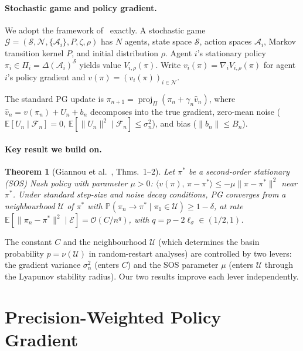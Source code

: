 \documentclass[10pt,letterpaper]{article}
\newtheorem{theorem}{Theorem}
\newcommand{\E}{\mathbb{E}}
\newcommand{\Prob}{\mathbb{P}}
\newcommand{\calS}{\mathcal{S}}
\newcommand{\calN}{\mathcal{N}}
\newcommand{\calA}{\mathcal{A}}
\newcommand{\calU}{\mathcal{U}}
\newcommand{\ip}[2]{\langle #1,\, #2 \rangle}
\newcommand{\norm}[1]{\| #1 \|}
\newcommand{\proj}{\operatorname{proj}}
\begin{document}
\paragraph{Stochastic game and policy gradient.}
We adopt the framework of~\cite{giannou2022} exactly.
A stochastic game $\mathcal{G} = (\calS, \calN, \{\calA_i\}, P, \zeta, \rho)$
has $N$ agents, state space $\calS$, action spaces $\calA_i$, Markov
transition kernel $P$, and initial distribution $\rho$. Agent $i$'s
stationary policy $\pi_i \in \Pi_i = \Delta(\calA_i)^{\calS}$ yields
value $V_{i,\rho}(\pi)$. Write $v_i(\pi) = \nabla_i V_{i,\rho}(\pi)$
for agent $i$'s policy gradient and $v(\pi) = (v_i(\pi))_{i \in \calN}$.

The standard PG update is $\pi_{n+1} = \proj_\Pi(\pi_n + \gamma_n \hat{v}_n)$,
where $\hat{v}_n = v(\pi_n) + U_n + b_n$ decomposes into the true
gradient, zero-mean noise ($\E[U_n \mid \mathcal{F}_n] = 0$,
$\E[\norm{U_n}^2 \mid \mathcal{F}_n] \leq \sigma_n^2$),
and bias ($\norm{b_n} \leq B_n$).

\paragraph{Key result we build on.}

\begin{theorem}[Giannou et al.~\cite{giannou2022}, Thms.~1--2]
\label{thm:giannou}
Let $\pi^*$ be a \emph{second-order stationary (SOS)} Nash policy with
parameter $\mu > 0$: $\ip{v(\pi)}{\pi - \pi^*} \leq -\mu\norm{\pi - \pi^*}^2$
near $\pi^*$. Under standard step-size and noise decay conditions,
PG converges from a neighbourhood $\calU$ of $\pi^*$ with
$\Prob(\pi_n \to \pi^* \mid \pi_1 \in \calU) \geq 1-\delta$, at rate
$\E[\norm{\pi_n - \pi^*}^2 \mid \mathcal{E}] = \mathcal{O}(C/n^q)$,
with $q = p - 2\ell_\sigma \in (1/2, 1)$.
\end{theorem}

The constant $C$ and the neighbourhood $\calU$ (which determines the
basin probability $p = \nu(\calU)$ in random-restart analyses) are
controlled by two levers: the gradient variance $\sigma_n^2$ (enters
$C$) and the SOS parameter $\mu$ (enters $\calU$ through the Lyapunov
stability radius). Our two results improve each lever independently.

\section{Precision-Weighted Policy Gradient}
\label{sec:pwpg}
\end{document}
